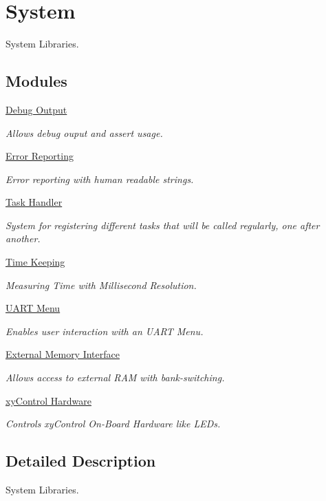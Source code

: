 \hypertarget{group___system}{\section{System}
\label{group___system}
}


System Libraries.  


\subsection*{Modules}
\begin{DoxyCompactItemize}
\item 
\hyperlink{group__debug}{Debug Output}
\begin{DoxyCompactList}\small\item\em Allows debug ouput and assert usage. \end{DoxyCompactList}\item 
\hyperlink{group__error}{Error Reporting}
\begin{DoxyCompactList}\small\item\em Error reporting with human readable strings. \end{DoxyCompactList}\item 
\hyperlink{group__task}{Task Handler}
\begin{DoxyCompactList}\small\item\em System for registering different tasks that will be called regularly, one after another. \end{DoxyCompactList}\item 
\hyperlink{group__time}{Time Keeping}
\begin{DoxyCompactList}\small\item\em Measuring Time with Millisecond Resolution. \end{DoxyCompactList}\item 
\hyperlink{group__uartmenu}{U\-A\-R\-T Menu}
\begin{DoxyCompactList}\small\item\em Enables user interaction with an U\-A\-R\-T Menu. \end{DoxyCompactList}\item 
\hyperlink{group__xmem}{External Memory Interface}
\begin{DoxyCompactList}\small\item\em Allows access to external R\-A\-M with bank-\/switching. \end{DoxyCompactList}\item 
\hyperlink{group__xycontrol}{xy\-Control Hardware}
\begin{DoxyCompactList}\small\item\em Controls xy\-Control On-\/\-Board Hardware like L\-E\-Ds. \end{DoxyCompactList}\end{DoxyCompactItemize}


\subsection{Detailed Description}
System Libraries. 